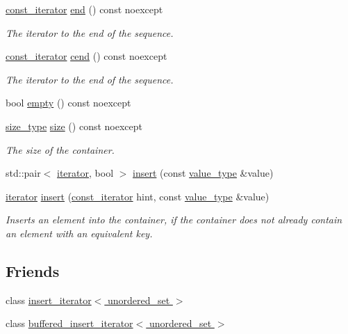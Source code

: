\begin{DoxyCompactItemize}
\hyperlink{group__Types_ga074f67d0516c3a68d8c79976aef62fb1}{const\-\_\-iterator} \hyperlink{group__Iterators_ga818d2e58976ab04e274c6e4545a91898}{end} () const noexcept
\begin{DoxyCompactList}\small\item\em The iterator to the end of the sequence. \end{DoxyCompactList}\item 
\hyperlink{group__Types_ga074f67d0516c3a68d8c79976aef62fb1}{const\-\_\-iterator} \hyperlink{group__Iterators_ga40eee9a29ad32b5981f0986ba2d102a8}{cend} () const noexcept
\begin{DoxyCompactList}\small\item\em The iterator to the end of the sequence. \end{DoxyCompactList}\item 
bool \hyperlink{group__Capacity_gaa881674aa4274da05c2389348d09bbd3}{empty} () const noexcept
\item 
\hyperlink{group__Types_gaf733341726e3097cf440257afa76d76a}{size\-\_\-type} \hyperlink{group__Capacity_ga2586e3957d1c48a278edaaa1be72f92b}{size} () const noexcept
\begin{DoxyCompactList}\small\item\em The size of the container. \end{DoxyCompactList}\item 
std\-::pair$<$ \hyperlink{group__Types_gadbad50ac069a38bd820c0a9f532f903e}{iterator}, bool $>$ \hyperlink{group__Modifiers_ga094b72a3c1d24f3061565a5c92fd60e4}{insert} (const \hyperlink{group__Types_ga56832ea0d8218bf22f59a2e8ff4de499}{value\-\_\-type} \&value)
\item 
\hyperlink{group__Types_gadbad50ac069a38bd820c0a9f532f903e}{iterator} \hyperlink{group__Modifiers_ga4364a63b4768ca4a4df2b497165fa0dc}{insert} (\hyperlink{group__Types_ga074f67d0516c3a68d8c79976aef62fb1}{const\-\_\-iterator} hint, const \hyperlink{group__Types_ga56832ea0d8218bf22f59a2e8ff4de499}{value\-\_\-type} \&value)
\begin{DoxyCompactList}\small\item\em Inserts an element into the container, if the container does not already contain an element with an equivalent key. \end{DoxyCompactList}\end{DoxyCompactItemize}
\subsection*{Friends}
\begin{DoxyCompactItemize}
\item 
class \hyperlink{classshad_1_1unordered__set_a11eb7166ffbdc7c5b29b9b465faf2321}{insert\-\_\-iterator$<$ unordered\-\_\-set $>$}
\item 
class \hyperlink{classshad_1_1unordered__set_a37f994eeafee71345ca4e4e8cd1435e8}{buffered\-\_\-insert\-\_\-iterator$<$ unordered\-\_\-set $>$}
\end{DoxyCompactItemize}


